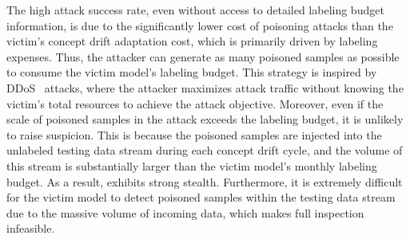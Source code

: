 The high attack success rate, even without access to detailed labeling budget information, is due to the significantly lower cost of poisoning attacks than the victim’s concept drift adaptation cost, which is primarily driven by labeling expenses.
Thus, the attacker can generate as many poisoned samples as possible to consume the victim model’s labeling budget.
This strategy is inspired by DDoS~\cite{mirkovic2004taxonomy} attacks, where the attacker maximizes attack traffic without knowing the victim’s total resources to achieve the attack objective.
Moreover, even if the scale of poisoned samples in the \pandora attack exceeds the labeling budget, it is unlikely to raise suspicion.
This is because the poisoned samples are injected into the unlabeled testing data stream during each concept drift cycle, and the volume of this stream is substantially larger than the victim model’s monthly labeling budget.
As a result, \pandora exhibits strong stealth. 
Furthermore, it is extremely difficult for the victim model to detect poisoned samples within the testing data stream due to the massive volume of incoming data, which makes full inspection infeasible.


